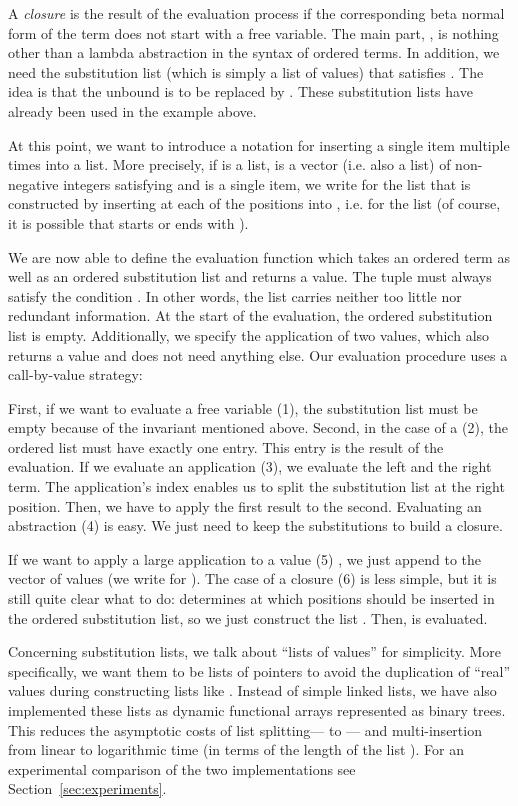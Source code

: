 \documentclass[submission,copyright,creativecommons]{eptcs}
\newcommand{\lab}[1]{\mbox{(#1)}}
\begin{document}
A \emph{closure}  is the result of the evaluation process if the corresponding beta normal form of the term does not start with a free variable. The main part, , is nothing other than a lambda abstraction in the syntax of ordered terms.
In addition, we need the substitution list  (which is simply a list of values) that satisfies . The idea is that the  unbound  is to be replaced by .  These substitution lists have already been used in the example above.


At this point, we want to introduce a notation for inserting a single item multiple times into a list. More precisely, if  is a list, 
 is a vector (i.e. also a list) of  non-negative integers satisfying  and  is a single item, we write   for the list that is constructed by inserting  at each of the positions  into , i.e. for the list  (of course, it is possible that  starts or ends with ).


We are now able to define the evaluation function  which takes an ordered term  as well as an ordered substitution list  and returns a value. The tuple must always satisfy the condition . In other words, the list carries neither too little nor redundant information.
At the start of the evaluation, the ordered substitution list is empty. 
Additionally, we specify the application  of two values, which also returns a value and does not need anything else.
Our evaluation procedure uses a call-by-value strategy:


First, if we want to evaluate a free variable \lab 1, the substitution list must be empty because of the invariant mentioned above. 
Second, in the case of a  \lab 2, the ordered list must have exactly one entry. This entry is the result of the evaluation. 
If we evaluate an application \lab 3, we evaluate the left and the right term. The application's index enables us to split the substitution list at the right position. Then, we have to apply the first result to the second. 
Evaluating an abstraction \lab 4 is easy. We just need to keep the substitutions to build a closure. 

If we want to apply a large application to a value  \lab 5 , we just append  to the vector of values (we write  for ). 
The case of a closure  \lab 6 is less simple, but it is still quite clear what to do:  determines at which positions  should be inserted in the ordered substitution list, so we just construct the list . Then,  is evaluated.


Concerning substitution lists, we talk about ``lists of values'' for
simplicity. More specifically, we want them to be lists of pointers to
avoid the duplication of ``real'' values during constructing lists
like . 
Instead of simple linked lists,
we have also implemented these lists as dynamic functional arrays
represented as binary trees.  This reduces the asymptotic costs of
list splitting--- to
---
and multi-insertion  
from linear to logarithmic time (in terms of the length of the list
).  For an
experimental comparison of the two implementations
see Section~\ref{sec:experiments}.
\end{document}
